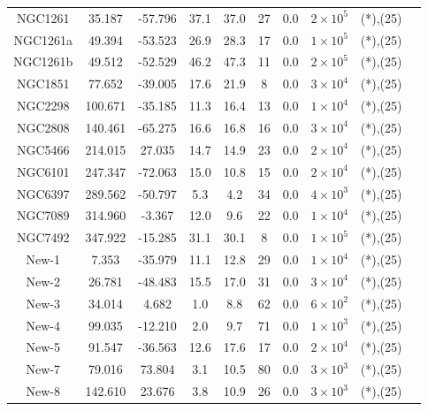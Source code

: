 \begin{table}
\begin{tabular}{cSSSSSSccc}
NGC1261 & 35.187 & -57.796 & 37.1 & 37.0 & 27 & 0.0 & $2 \times 10^{5}$ & (*),(25) \\
NGC1261a & 49.394 & -53.523 & 26.9 & 28.3 & 17 & 0.0 & $1 \times 10^{5}$ & (*),(25) \\
NGC1261b & 49.512 & -52.529 & 46.2 & 47.3 & 11 & 0.0 & $2 \times 10^{5}$ & (*),(25) \\
NGC1851 & 77.652 & -39.005 & 17.6 & 21.9 & 8 & 0.0 & $3 \times 10^{4}$ & (*),(25) \\
NGC2298 & 100.671 & -35.185 & 11.3 & 16.4 & 13 & 0.0 & $1 \times 10^{4}$ & (*),(25) \\
NGC2808 & 140.461 & -65.275 & 16.6 & 16.8 & 16 & 0.0 & $3 \times 10^{4}$ & (*),(25) \\
NGC5466 & 214.015 & 27.035 & 14.7 & 14.9 & 23 & 0.0 & $2 \times 10^{4}$ & (*),(25) \\
NGC6101 & 247.347 & -72.063 & 15.0 & 10.8 & 15 & 0.0 & $2 \times 10^{4}$ & (*),(25) \\
NGC6397 & 289.562 & -50.797 & 5.3 & 4.2 & 34 & 0.0 & $4 \times 10^{3}$ & (*),(25) \\
NGC7089 & 314.960 & -3.367 & 12.0 & 9.6 & 22 & 0.0 & $1 \times 10^{4}$ & (*),(25) \\
NGC7492 & 347.922 & -15.285 & 31.1 & 30.1 & 8 & 0.0 & $1 \times 10^{5}$ & (*),(25) \\
New-1 & 7.353 & -35.979 & 11.1 & 12.8 & 29 & 0.0 & $1 \times 10^{4}$ & (*),(25) \\
New-2 & 26.781 & -48.483 & 15.5 & 17.0 & 31 & 0.0 & $3 \times 10^{4}$ & (*),(25) \\
New-3 & 34.014 & 4.682 & 1.0 & 8.8 & 62 & 0.0 & $6 \times 10^{2}$ & (*),(25) \\
New-4 & 99.035 & -12.210 & 2.0 & 9.7 & 71 & 0.0 & $1 \times 10^{3}$ & (*),(25) \\
New-5 & 91.547 & -36.563 & 12.6 & 17.6 & 17 & 0.0 & $2 \times 10^{4}$ & (*),(25) \\
New-7 & 79.016 & 73.804 & 3.1 & 10.5 & 80 & 0.0 & $3 \times 10^{3}$ & (*),(25) \\
New-8 & 142.610 & 23.676 & 3.8 & 10.9 & 26 & 0.0 & $3 \times 10^{3}$ & (*),(25) \\
\hline \hline
\end{tabular}
\end{table}
